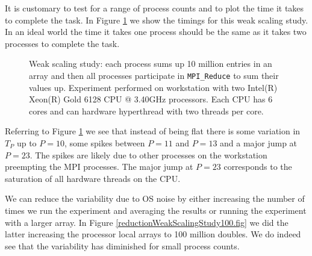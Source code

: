 It is customary to test for a range of process counts and to plot the time it takes to complete the task. In Figure \ref{reductionWeakScalingStudy.fig} we show the timings for this weak scaling study. In an ideal world the time it takes one process should be the same as it takes two processes to complete the task. 
\begin{figure}[htbp!]
\begin{center}
\end{center}
\caption{Weak scaling study: each process sums up 10 million entries in an array and then all processes participate in \texttt{MPI\_Reduce} to sum their values up. Experiment performed on workstation with two   Intel(R) Xeon(R) Gold 6128 CPU @ 3.40GHz processors. Each CPU has 6 cores and can hardware hyperthread with two threads per core.
 }
\label{reductionWeakScalingStudy.fig}
\end{figure}

Referring to Figure \ref{reductionWeakScalingStudy.fig} we see that instead of being flat there is some variation in $T_P$ up to $P=10$, some spikes between $P=11$ and $P=13$ and a major jump at $P=23$. The spikes are likely due to other processes on the workstation preempting the MPI processes. The major jump at $P=23$ corresponds to the saturation of all hardware threads on the CPU. 

We can reduce the variability due to OS noise by either increasing the number of times we run the experiment and averaging the results or running the experiment with a larger array. In Figure \ref{reductionWeakScalingStudy100.fig} we did the latter increasing the processor local arrays to 100 million doubles.  We do indeed see that the variability has diminished for small process counts. 

